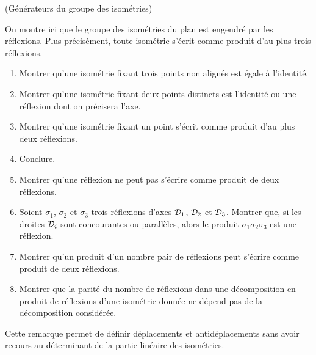 \documentclass[a4paper,11pt,reqno]{amsart}
\begin{document}
\begin{exo} (Générateurs du groupe des isométries)

  On montre ici que le groupe des isométries du plan est engendré par les réflexions. Plus précisément, toute isométrie s'écrit comme produit d'au plus trois réflexions.
  \begin{enumerate}
    \item Montrer qu'une isométrie fixant trois points non alignés est égale à l'identité.
    \item Montrer qu'une isométrie fixant deux points distincts est l'identité ou une réflexion dont on précisera l'axe.
    \item Montrer qu'une isométrie fixant un point s'écrit comme produit d'au plus deux réflexions.
    \item Conclure.
    \item Montrer qu'une réflexion ne peut pas s'écrire comme produit de deux réflexions.
    \item Soient $\sigma_1$, $\sigma_2$ et $\sigma_3$ trois réflexions d'axes $\mathcal{D}_1$, $\mathcal{D}_2$ et $\mathcal{D}_3$. Montrer que, si les droites $\mathcal{D}_i$ sont concourantes ou parallèles, alors le produit $\sigma_1 \sigma_2 \sigma_3$ est une réflexion.
    \item Montrer qu'un produit d'un nombre pair de réflexions peut s'écrire comme produit de deux réflexions.
    \item Montrer que la parité du nombre de réflexions dans une décomposition en produit de réflexions d'une isométrie donnée ne dépend pas de la décomposition considérée.
  \end{enumerate}
  Cette remarque permet de définir déplacements et antidéplacements sans avoir recours au déterminant de la partie linéaire des isométries.
\end{exo}
\end{document}
